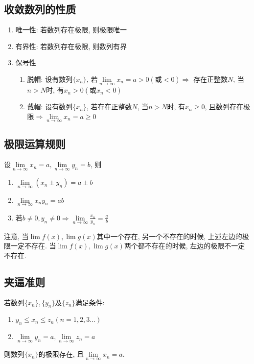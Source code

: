 \subsection{收敛数列的性质}
\begin{enumerate}
    \item 唯一性: 若数列存在极限, 则极限唯一
    \item 有界性: 若数列存在极限, 则数列有界
    \item 保号性
          \begin{enumerate}
              \item 脱帽: 设有数列$ \{x_{n}\} $, 若$ \lim\limits_{n\rightarrow \infty}x_{n}=a>0(\text{或}<0)\Rightarrow $ 存在正整数$ N $, 当$ n>N $时, 有$ x_{n}>0(\text{或}x_{n}<0) $
              \item 戴帽: 设有数列$ \{x_{n}\} $, 若存在正整数$ N $, 当$ n>N $时, 有$ x_{n}\ge 0 $, 且数列存在极限$ \Rightarrow \lim\limits_{n\rightarrow \infty}x_{n}=a\ge 0 $
          \end{enumerate}
\end{enumerate}
\subsection{极限运算规则}
设$ \lim\limits_{n\rightarrow \infty}x_{n}=a, \lim\limits_{n\rightarrow \infty}y_{n}=b $, 则
\begin{enumerate}
    \item $ \lim\limits_{n\rightarrow \infty}(x_{n}\pm y_{n})=a\pm b $
    \item $ \lim\limits_{n\rightarrow \infty}x_{n}y_{n}=ab $
    \item 若$ b\neq 0, y_{n}\neq 0 \Rightarrow \lim\limits_{n\rightarrow \infty}\frac{x_{n}}{y_{n}}=\frac{a}{b}$
\end{enumerate}\par
注意, 当$ \lim\limits f(x), \lim\limits g(x) $其中一个存在, 另一个不存在的时候, 上述左边的极限一定不存在. 当$ \lim\limits f(x), \lim\limits g(x) $两个都不存在的时候, 左边的极限不一定不存在.
\subsection{夹逼准则}
若数列$ \{x_{n}\}, \{y_{n}\} $及$ \{z_{n}\} $满足条件:
\begin{enumerate}
    \item $ y_{n}\le x_{n}\le z_{n}(n=1,2,3...) $
    \item $ \lim\limits_{n\rightarrow \infty}y_{n}=a, \lim\limits_{n\rightarrow \infty}z_{n}=a $
\end{enumerate}\par
则数列$ \{x_{n}\} $的极限存在, 且$ \lim\limits_{n\rightarrow \infty}x_{n}=a $.
